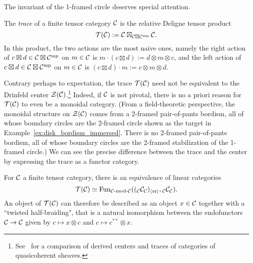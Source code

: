 \documentclass{amsart}
\begin{document}
The invariant of the 1-framed circle deserves special attention.
\begin{definition}
The \emph{trace} of a finite tensor category $\mathcal C$ is the relative Deligne tensor product 
\[
\mathcal T(\mathcal C) := \mathcal C \boxtimes_{\mathcal C \boxtimes \mathcal C^{\mathrm{mp}}} \mathcal C.
\]
In this product, the two actions are the most naive ones, namely the right action of $c \boxtimes d \in \mathcal C \boxtimes \mathcal C^{\mathrm{mp}}$ on $m \in \mathcal C$ is $m \cdot (c \boxtimes d) := d \otimes m \otimes c$, and the left action of $c \boxtimes d \in \mathcal C \boxtimes \mathcal C^{\mathrm{mp}}$ on $m \in \mathcal C$ is $(c \boxtimes d) \cdot m := c \otimes m \otimes d$.
\end{definition}
Contrary perhaps to expectation, the trace $\mathcal T(\mathcal C)$ need not be equivalent to the Drinfeld center $\mathcal Z(\mathcal C)$.\footnote{See~\cite{bzfn} for a comparison of derived centers and traces of categories of quasicoherent sheaves.}  Indeed, if $\mathcal C$ is not pivotal, there is no a priori reason for $\mathcal T(\mathcal C)$ to even be a monoidal category.  (From a field-theoretic perspective, the monoidal structure on $\mathcal Z(\mathcal C)$ comes from a 2-framed pair-of-pants bordism, all of whose boundary circles are the 2-framed circle shown as the target in Example~\ref{ex:disk_bordism_immersed}.  There is no 2-framed pair-of-pants bordism, all of whose boundary circles are the 2-framed stabilization of the 1-framed circle.)  We can see the precise difference between the trace and the center by expressing the trace as a functor category.
\begin{corollary}
For $\mathcal C$ a finite tensor category, there is an equivalence of linear categories
\[
\cT(\cC) \simeq \Fun_{\mod{\cC}{\cC}}(({}_\cC \cC_\cC)_{\langle \mathfrak{r r} \rangle},{}_\cC \cC_\cC).
\]
An object of $\mathcal T(\mathcal C)$ can therefore be described as an object $x \in \mathcal C$ together with a ``twisted half-braiding", that is a natural isomorphism between the endofunctors $\mathcal C \rightarrow \mathcal C$ given by $c \mapsto x \otimes c$ and $c \mapsto c^{**} \otimes x$.
\end{corollary}
\end{document}
